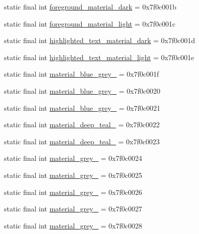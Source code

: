\begin{CompactItemize}
static final int \hyperlink{classandroid_1_1support_1_1v4_1_1_r_1_1color_48dfe3988b7ce8387a91268c03e25e9b}{foreground\_\-material\_\-dark} = 0x7f0c001b
\item 
static final int \hyperlink{classandroid_1_1support_1_1v4_1_1_r_1_1color_f254c961dbfe882a75c14cf8f6f78b27}{foreground\_\-material\_\-light} = 0x7f0c001c
\item 
static final int \hyperlink{classandroid_1_1support_1_1v4_1_1_r_1_1color_d339b2a44a21dc8ece320b8047f59f32}{highlighted\_\-text\_\-material\_\-dark} = 0x7f0c001d
\item 
static final int \hyperlink{classandroid_1_1support_1_1v4_1_1_r_1_1color_e48fa945c0f4c914e54a0bfdc1638ab9}{highlighted\_\-text\_\-material\_\-light} = 0x7f0c001e
\item 
static final int \hyperlink{classandroid_1_1support_1_1v4_1_1_r_1_1color_9ccfc20cbcf072cb22942eb7c4fa0633}{material\_\-blue\_\-grey\_} = 0x7f0c001f
\item 
static final int \hyperlink{classandroid_1_1support_1_1v4_1_1_r_1_1color_6e568bc349238f925eaee77b3805e95f}{material\_\-blue\_\-grey\_} = 0x7f0c0020
\item 
static final int \hyperlink{classandroid_1_1support_1_1v4_1_1_r_1_1color_0e350491f0890cc1fc0c460274918e7a}{material\_\-blue\_\-grey\_} = 0x7f0c0021
\item 
static final int \hyperlink{classandroid_1_1support_1_1v4_1_1_r_1_1color_039f8698874d0da92d0aec4b0223bab6}{material\_\-deep\_\-teal\_} = 0x7f0c0022
\item 
static final int \hyperlink{classandroid_1_1support_1_1v4_1_1_r_1_1color_8483f49d78fde9d6ca175933c60e2f42}{material\_\-deep\_\-teal\_} = 0x7f0c0023
\item 
static final int \hyperlink{classandroid_1_1support_1_1v4_1_1_r_1_1color_148f2d0dbc9acf65a866c6d248bd21d6}{material\_\-grey\_} = 0x7f0c0024
\item 
static final int \hyperlink{classandroid_1_1support_1_1v4_1_1_r_1_1color_1df4d2c510b0db4286841ba585e3214a}{material\_\-grey\_} = 0x7f0c0025
\item 
static final int \hyperlink{classandroid_1_1support_1_1v4_1_1_r_1_1color_e1b172850c18ccaf00a2b97ee2a585e2}{material\_\-grey\_} = 0x7f0c0026
\item 
static final int \hyperlink{classandroid_1_1support_1_1v4_1_1_r_1_1color_bb1c48cfec63055b48ca69c6fc5a3815}{material\_\-grey\_} = 0x7f0c0027
\item 
static final int \hyperlink{classandroid_1_1support_1_1v4_1_1_r_1_1color_a338d4ee2ab9cebbc9d4af8945e2703a}{material\_\-grey\_} = 0x7f0c0028

\end{CompactItemize}
